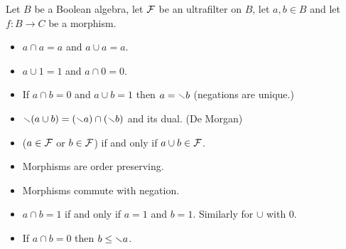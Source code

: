\begin{lem}
    Let $B$ be a Boolean algebra, let $\mathcal{F}$ be an ultrafilter
    on $B$, let $a,b \in B$ and let $f : B \to C$ be a morphism.
    \begin{itemize}
        \item $a \cap a = a$ and $a \cup a = a$.
        \item $a \cup 1 = 1$ and $a \cap 0 = 0$.
        \item If $a \cap b = 0$ and $a \cup b = 1$ then $a = \smallsetminus b$
            (negations are unique.)
        \item $\smallsetminus (a \cup b) = (\smallsetminus a) \cap (\smallsetminus b)$ and its dual. 
            (De Morgan)
        \item ($a \in \mathcal{F}$ or $b \in \mathcal{F}$) if and only if $a \cup b \in \mathcal{F}$.
        \item Morphisms are order preserving.
        \item Morphisms commute with negation.
        \item $a \cap b = 1$ if and only if $a = 1$ and $b = 1$.
            Similarly for $\cup$ with $0$.
        \item If $a \cap b = 0$ then $b \leq \smallsetminus a$.
    \end{itemize}
\end{lem}
